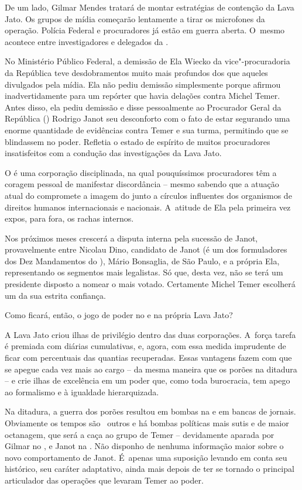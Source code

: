 De um lado, Gilmar Mendes tratará de montar estratégias de contenção da
Lava Jato. Os grupos de mídia começarão lentamente a tirar os microfones
da operação. Polícia Federal e procuradores já estão em guerra aberta. O~mesmo acontece entre investigadores e delegados da .

No Ministério Público Federal, a demissão de Ela Wiecko da
vice"-procuradoria da República teve desdobramentos muito mais profundos
dos que aqueles divulgados pela mídia. Ela não pediu demissão
simplesmente porque afirmou inadvertidamente para um repórter que havia
delações contra Michel Temer. Antes disso, ela pediu demissão e disse
pessoalmente ao Procurador Geral da República () Rodrigo Janot seu
desconforto com o fato de estar segurando uma enorme quantidade de
evidências contra Temer e sua turma, permitindo que se blindassem no
poder. Refletia o estado de espírito de muitos procuradores
insatisfeitos com a condução das investigações da Lava Jato.

O  é uma corporação disciplinada, na qual pouquíssimos procuradores
têm a coragem pessoal de manifestar discordância -- mesmo sabendo que a
atuação atual do  compromete a imagem do  junto a círculos
influentes dos organismos de direitos humanos internacionais e
nacionais. A~atitude de Ela pela primeira vez expos, para fora, os
rachas internos.

Nos próximos meses crescerá a disputa interna pela sucessão de Janot,
provavelmente entre Nicolau Dino, candidato de Janot (é um dos
formuladores dos Dez Mandamentos do ), Mário Bonsaglia, de São Paulo,
e a própria Ela, representando os segmentos mais legalistas. Só que,
desta vez, não se terá um presidente disposto a nomear o mais votado.
Certamente Michel Temer escolherá um  da sua estrita confiança.

Como ficará, então, o jogo de poder no  e na própria Lava Jato?

A Lava Jato criou ilhas de privilégio dentro das duas corporações. A~força tarefa é premiada com diárias cumulativas, e, agora, com essa
medida imprudente de ficar com percentuais das quantias recuperadas.
Essas vantagens fazem com que se apegue cada vez mais ao cargo -- da
mesma maneira que os porões na ditadura -- e crie ilhas de excelência em
um poder que, como toda burocracia, tem apego ao formalismo e à
igualdade hierarquizada.

Na ditadura, a guerra dos porões resultou em bombas na  e em bancas
de jornais. Obviamente os tempos são ~outros e há bombas políticas mais
sutis e de maior octanagem, que será a caça ao grupo de Temer --
devidamente aparada por Gilmar no , e Janot na . Não disponho de
nenhuma informação maior sobre o novo comportamento de Janot. É~apenas
uma suposição levando em conta seu histórico, seu caráter adaptativo,
ainda mais depois de ter se tornado o principal articulador das
operações que levaram Temer ao poder.

